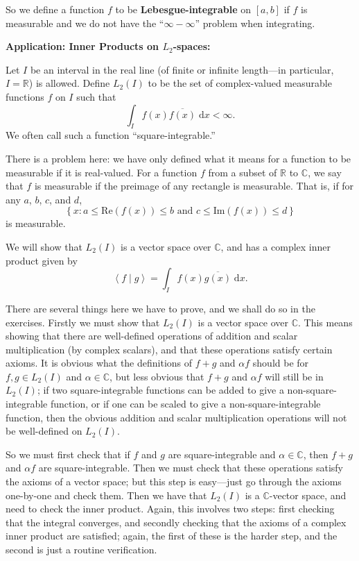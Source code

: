\documentclass{article}
\newcommand{\diff}{\;\mathrm{d}}
\newcommand{\braket}[2]{\left\langle #1 \mid #2 \right\rangle}
\begin{document}
So we define a function $f$ to be \textbf{Lebesgue-integrable} on $[a,b]$ if $f$ is measurable and we do not have the ``$\infty-\infty$'' problem when integrating.






\clearpage




\textbf{Application: Inner Products on $L_2$-spaces:}\bigskip


Let $I$ be an interval in the real line (of finite or infinite length---in particular, $I=\mathbb{R}$) is allowed. Define $L_2(I)$ to be the set of complex-valued measurable functions $f$ on $I$ such that
\[\int_I f(x)\overline{f(x)}\diff x <\infty.\]
We often call such a function ``square-integrable.''

There is a problem here: we have only defined what it means for a function to be measurable if it is real-valued. For a function $f$ from a subset of $\mathbb{R}$ to $\mathbb{C}$, we say that $f$ is measurable if the preimage of any rectangle is measurable. That is, if for any $a$, $b$, $c$, and $d$,
\[\left\{x:a\leq \mathrm{Re}(f(x))\leq b \mbox{ and } c\leq \mathrm{Im}(f(x))\leq d\right\}\]
is measurable.

We will show that $L_2(I)$ is a vector space over $\mathbb{C}$, and has a complex inner product given by
\[\braket{f}{g}=\int_I f(x)\overline{g(x)}\diff x.\]


There are several things here we have to prove, and we shall do so in the exercises. Firstly we must show that $L_2(I)$ is a vector space over $\mathbb{C}$. This means showing that there are well-defined operations of addition and scalar multiplication (by complex scalars), and that these operations satisfy certain axioms. It is obvious what the definitions of $f+g$ and $\alpha f$ should be for $f,g\in L_2(I)$ and $\alpha\in\mathbb{C}$, but less obvious that $f+g$ and $\alpha f$ will still be in $L_2(I)$; if two square-integrable functions can be added to give a non-square-integrable function, or if one can be scaled to give a non-square-integrable function, then the obvious addition and scalar multiplication operations will not be well-defined on $L_2(I)$.

So we must first check that if $f$ and $g$ are square-integrable and $\alpha\in\mathbb{C}$, then $f+g$ and $\alpha f$ are square-integrable. Then we must check that these operations satisfy the axioms of a vector space; but this step is easy---just go through the axioms one-by-one and check them. Then we have that $L_2(I)$ is a $\mathbb{C}$-vector space, and need to check the inner product. Again, this involves two steps: first checking that the integral converges, and secondly checking that the axioms of a complex inner product are satisfied; again, the first of these is the harder step, and the second is just a routine verification.
\end{document}
